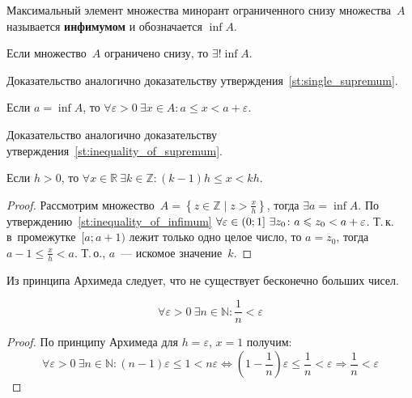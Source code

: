  Максимальный элемент множества минорант ограниченного снизу множества~$A$ называется \textbf{инфимумом} и обозначается $\inf A$.

\begin{statement}
Если множество~$A$ ограничено снизу, то $\exists! \inf A$.
\end{statement}%
Доказательство аналогично доказательству утверждения~\ref*{st:single_supremum}.

\begin{statement}
\label{st:inequality_of_infimum}
Если $a = \inf A$, то $\forall \varepsilon > 0 \ \exists x \in A \colon a \leqslant x < a + \varepsilon$.
\end{statement}%
Доказательство аналогично доказательству утверждения~\ref*{st:inequality_of_supremum}.

\begin{theorem}
Если $h > 0$, то
$\forall x \in \mathbb R \ \exists k \in \mathbb Z \colon (k - 1)h \leqslant x < kh$.
\end{theorem}
\begin{proof}
Рассмотрим множество~$A = \left\{ z \in \mathbb Z \mid z > \frac{x}h \right\}$, тогда $\exists a = \inf A$.
По утверждению~\ref*{st:inequality_of_infimum}
$\forall \varepsilon \in \nobreak (0; 1] \ \exists z_0 \colon a \leqslant z_0 < a + \varepsilon$.
Т.\,к. в~промежутке~$[a; a + 1)$ лежит только одно целое число, то $a = z_0$, тогда $a - 1 \leqslant \frac{x}h < a$.
Т.\,о., $a$~--- искомое значение~$k$.
\end{proof}

Из принципа Архимеда следует, что не существует бесконечно больших чисел.

\begin{consequent}
\label{conseq:small_rational_exists}
\begin{equation*}
\forall \varepsilon > 0 \ \exists n \in \mathbb N \colon \frac1n < \varepsilon
\end{equation*}
\end{consequent}
\begin{proof}
По принципу Архимеда для $h = \varepsilon$, $x = 1$ получим:
\begin{equation*}
\forall \varepsilon > 0 \ \exists n \in \mathbb N \colon
(n - 1)\varepsilon \leqslant 1 < n\varepsilon \Leftrightarrow
\left(1 - \frac1n\right)\varepsilon \leqslant \frac1n < \varepsilon \Rightarrow
\frac1n < \varepsilon
\end{equation*}
\end{proof}


